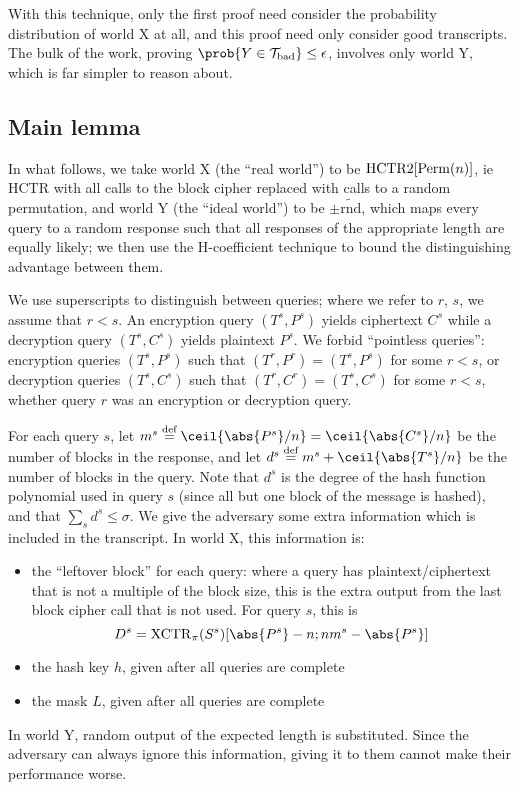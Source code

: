 \documentclass[hctr.tex]{subfiles}
\begin{document}
With this technique, only the first proof
need consider the probability
distribution of world X at all,
and this proof need only consider good transcripts.
The bulk of the work, proving
\(\prob{Y \in \Tb} \leq \epsilon\),
involves only world Y, which is far simpler
to reason about.

\subsection{Main lemma}\label{mainlemma}
In what follows, we take world X (the ``real world'') 
to be \(\operatorname{HCTR2}[\operatorname{Perm}(n)]\),
ie HCTR with all calls to the block cipher
replaced with calls to a random permutation,
and world Y (the ``ideal world'') to be \(\pm\widetilde{\mathrm{rnd}}\),
which maps every query to a random response such that
all responses of the appropriate length are equally likely;
we then use the H-coefficient technique to bound
the distinguishing advantage between them.

We use superscripts to distinguish between queries;
where we refer to \(r\), \(s\), we assume that \(r < s\).
An encryption query \((T^s, P^s)\) yields ciphertext \(C^s\)
while a decryption query \((T^s, C^s)\)
yields plaintext \(P^s\).
We forbid ``pointless queries'':
encryption queries \((T^s, P^s)\)
such that \((T^r, P^r) = (T^s, P^s)\) for some \(r < s\), 
or decryption queries \((T^s, C^s)\)
such that \((T^r, C^r) = (T^s, C^s)\) for some \(r < s\),
whether query \(r\) was an encryption or decryption query.

For each query \(s\), 
let \(m^s \defeq \ceil{\abs{P^s}/n} = \ceil{\abs{C^s}/n}\)
be the number of blocks in the response,
and let \(d^s \defeq m^s + \ceil{\abs{T^s}/n}\)
be the number of blocks in the query.
Note that \(d^s\) is the degree of the hash
function polynomial used in query \(s\)
(since all but one block of the message is hashed),
and that \(\sum_s d^s \leq \sigma\).
We give the adversary some extra information
which is included in the transcript.
In world X, this information is:
\begin{itemize}
    \item the ``leftover block'' for each query:
    where a query has plaintext/ciphertext
    that is not a multiple of the block size,
    this is the extra output from the last
    block cipher call that is not used.
    For query \(s\), this is 
    \begin{displaymath}
        D^s = \XCTR_\pi(S^s)[\abs{P^s} - n; nm^s-\abs{P^s}]
    \end{displaymath}
    \item the hash key \(h\), given after all queries are complete
    \item the mask \(L\), given after all queries are complete
\end{itemize}
In world Y, random output of the expected
length is substituted. Since the adversary can always ignore
this information, giving it to them cannot make their performance worse.
\end{document}
